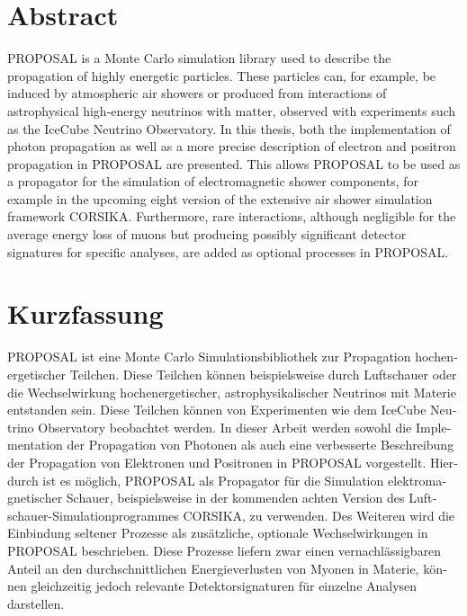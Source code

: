 \thispagestyle{plain}

\section*{Abstract}

PROPOSAL is a \CC Monte Carlo simulation library used to describe the propagation of highly energetic particles. 
These particles can, for example, be induced by atmospheric air showers or produced from interactions of astrophysical high-energy neutrinos with matter, observed with experiments such as the IceCube Neutrino Observatory. 
In this thesis, both the implementation of photon propagation as well as a more precise description of electron and positron propagation in PROPOSAL are presented.
This allows PROPOSAL to be used as a propagator for the simulation of electromagnetic shower components, for example in the upcoming eight version of the extensive air shower simulation framework CORSIKA. 
Furthermore, rare interactions, although negligible for the average energy loss of muons but producing possibly significant detector signatures for specific analyses, are added as optional processes in PROPOSAL.

\section*{Kurzfassung}
\begin{german}

PROPOSAL ist eine \CC Monte Carlo Simulationsbibliothek zur Propagation hochenergetischer Teilchen.
Diese Teilchen können beispielsweise durch Luftschauer oder die Wechselwirkung hochenergetischer, astrophysikalischer Neutrinos mit Materie entstanden sein.
Diese Teilchen können von Experimenten wie dem IceCube Neutrino Observatory beobachtet werden.
In dieser Arbeit werden sowohl die Implementation der Propagation von Photonen als auch eine verbesserte Beschreibung der Propagation von Elektronen und Positronen in PROPOSAL vorgestellt.
Hierdurch ist es möglich, PROPOSAL als Propagator für die Simulation elektromagnetischer Schauer, beispielsweise in der kommenden achten Version des Luftschauer-Simulationprogrammes CORSIKA, zu verwenden.
Des Weiteren wird die Einbindung seltener Prozesse als zusätzliche, optionale Wechselwirkungen in PROPOSAL beschrieben.
Diese Prozesse liefern zwar einen vernachlässigbaren Anteil an den durchschnittlichen Energieverlusten von Myonen in Materie, können gleichzeitig jedoch relevante Detektorsignaturen für einzelne Analysen darstellen. 

\end{german}
